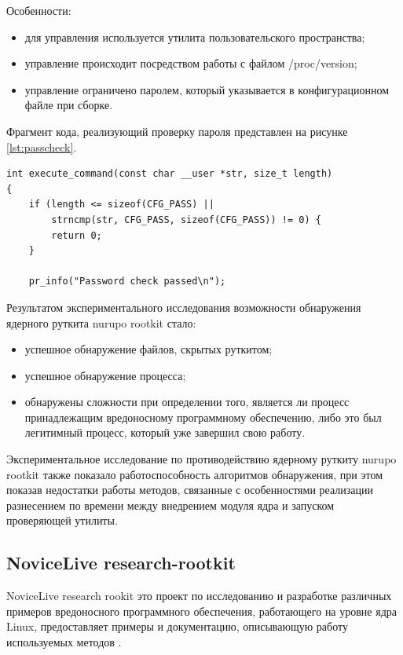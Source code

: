 \documentclass{gost7.32-2001}
\begin{document}
Особенности:
\begin{itemize}
\item
  для управления используется утилита пользовательского пространства;
\item
  управление происходит посредством работы с файлом /proc/version;
\item
  управление ограничено паролем, который указывается в
  конфигурационном файле при сборке.
\end{itemize}

Фрагмент кода, реализующий проверку пароля представлен на рисунке
\ref{lst:passcheck}.

\begin{lstlisting}[caption={Реализация проверки пароля},
    captionpos=b, float, label={lst:passcheck}]
int execute_command(const char __user *str, size_t length)
{
    if (length <= sizeof(CFG_PASS) ||
        strncmp(str, CFG_PASS, sizeof(CFG_PASS)) != 0) {
        return 0;
    }

    pr_info("Password check passed\n");
\end{lstlisting}

Результатом экспериментального исследования возможности обнаружения
ядерного руткита nurupo rootkit стало:
\begin{itemize}
\item
  успешное обнаружение файлов, скрытых руткитом;
\item
  успешное обнаружение процесса;
\item
  обнаружены сложности при определении того, является ли процесс
  принадлежащим вредоносному программному обеспечению, либо это был
  легитимный процесс, который уже завершил свою работу.
\end{itemize}

Экспериментальное исследование по противодействию ядерному руткиту
nurupo rootkit также показало работоспособность алгоритмов
обнаружения, при этом показав недостатки работы методов, связанные с
особенностями реализации \dash разнесением по времени между внедрением
модуля ядра и запуском проверяющей утилиты.

\subsection{NoviceLive research-rootkit}

NoviceLive research rookit \dash это проект по исследованию и
разработке различных примеров вредоносного программного обеспечения,
работающего на уровне ядра Linux, предоставляет примеры и
документацию, описывающую работу используемых методов
.
\end{document}
